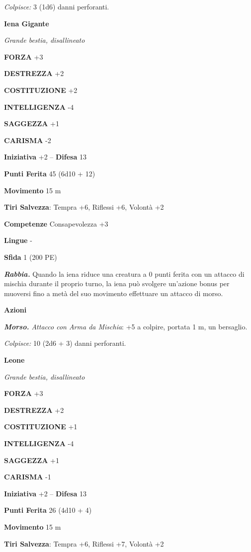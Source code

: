 \begin{multicols}{2}
\emph{Colpisce:} 3 (1d6) danni perforanti.

\medskip\textbf{Iena Gigante}

\emph{Grande bestia, disallineato}

\textbf{FORZA} +3

\textbf{DESTREZZA} +2

\textbf{COSTITUZIONE} +2

\textbf{INTELLIGENZA} -4

\textbf{SAGGEZZA} +1

\textbf{CARISMA} -2

\textbf{Iniziativa} +2 -- \textbf{Difesa} 13

\textbf{Punti Ferita} 45 (6d10 + 12)

\textbf{Movimento} 15 m

\textbf{Tiri Salvezza}: Tempra +6, Riflessi +6, Volontà +2 

\textbf{Competenze} Consapevolezza +3

\textbf{Lingue} -

\textbf{Sfida} 1 (200 PE)

\emph{\textbf{Rabbia.}} Quando la iena riduce una creatura a 0 punti ferita con un attacco di mischia durante il proprio turno, la iena può svolgere un'azione bonus per muoversi fino a metà del suo movimento effettuare un attacco di morso.

\textbf{Azioni}

\emph{\textbf{Morso.} Attacco con Arma da Mischia}: +5 a colpire, portata 1 m, un bersaglio.

\emph{Colpisce:} 10 (2d6 + 3) danni perforanti.

\medskip\textbf{Leone}

\emph{Grande bestia, disallineato}

\textbf{FORZA} +3

\textbf{DESTREZZA} +2

\textbf{COSTITUZIONE} +1

\textbf{INTELLIGENZA} -4

\textbf{SAGGEZZA} +1

\textbf{CARISMA} -1

\textbf{Iniziativa} +2 -- \textbf{Difesa} 13

\textbf{Punti Ferita} 26 (4d10 + 4)

\textbf{Movimento} 15 m

\textbf{Tiri Salvezza}: Tempra +6, Riflessi +7, Volontà +2 


\end{multicols}

